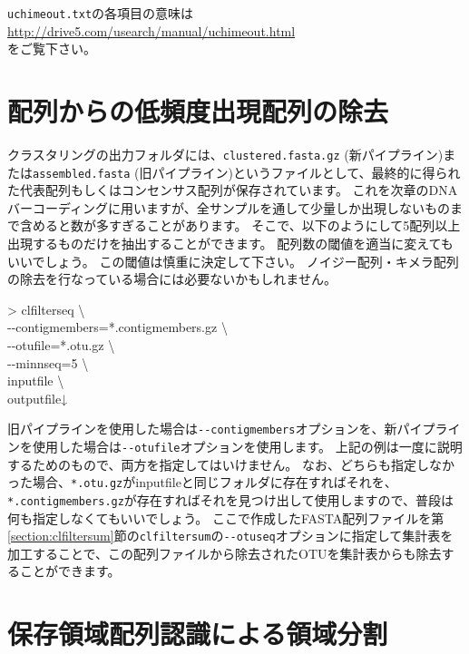 \documentclass[titlepage,10pt,a4paper,english]{jsbook}
\newenvironment{cmd}{\begin{oframed}\raggedright\ttfamily\footnotesize\setlength{\baselineskip}{1.4em}}{\end{oframed}\vspace{-1em}}
\begin{document}
\texttt{uchimeout.txt}の各項目の意味は\\
\href{http://drive5.com/usearch/manual/uchimeout.html}{http://drive5.com/usearch/manual/uchimeout.html}\\
をご覧下さい。

\section{配列からの低頻度出現配列の除去}

クラスタリングの出力フォルダには、\texttt{clustered.fasta.gz} (新パイプライン)または\texttt{assembled.fasta} (旧パイプライン)というファイルとして、最終的に得られた代表配列もしくはコンセンサス配列が保存されています。
これを次章のDNAバーコーディングに用いますが、全サンプルを通して少量しか出現しないものまで含めると数が多すぎることがあります。
そこで、以下のようにして5配列以上出現するものだけを抽出することができます。
配列数の閾値を適当に変えてもいいでしょう。
この閾値は慎重に決定して下さい。
ノイジー配列・キメラ配列の除去を行なっている場合には必要ないかもしれません。
\begin{cmd}
{\textgreater} clfilterseq {\textbackslash}\\
{-}{-}contigmembers=*.contigmembers.gz {\textbackslash}\\
{-}{-}otufile=*.otu.gz {\textbackslash}\\
{-}{-}minnseq=5 {\textbackslash}\\
inputfile {\textbackslash}\\
outputfile↓
\end{cmd}
旧パイプラインを使用した場合は\texttt{{-}{-}contigmembers}オプションを、新パイプラインを使用した場合は\texttt{{-}{-}otufile}オプションを使用します。
上記の例は一度に説明するためのもので、両方を指定してはいけません。
なお、どちらも指定しなかった場合、\texttt{*.otu.gz}がinputfileと同じフォルダに存在すればそれを、\texttt{*.contigmembers.gz}が存在すればそれを見つけ出して使用しますので、普段は何も指定しなくてもいいでしょう。
ここで作成したFASTA配列ファイルを第\ref{section:clfiltersum}節の\texttt{clfiltersum}の\texttt{{-}{-}otuseq}オプションに指定して集計表を加工することで、この配列ファイルから除去されたOTUを集計表からも除去することができます。

\section{保存領域配列認識による領域分割}
\end{document}
